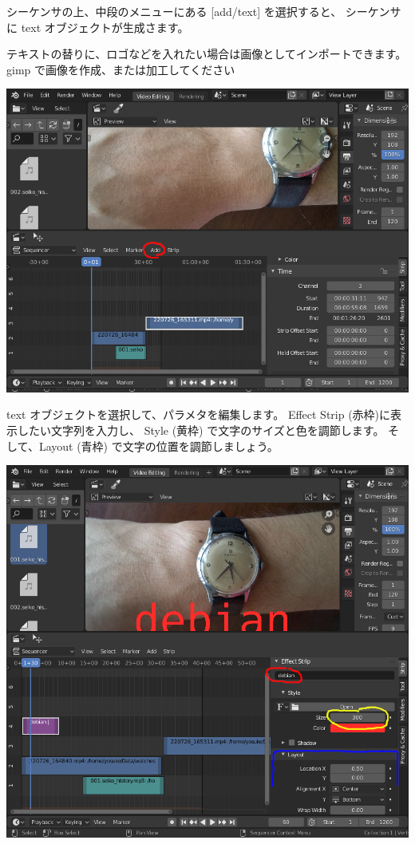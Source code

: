 \documentclass[mingoth,a4paper]{jsarticle}
\begin{document}
シーケンサの上、中段のメニューにある [add/text] を選択すると、
シーケンサに text オブジェクトが生成さます。

テキストの替りに、ロゴなどを入れたい場合は画像としてインポートできます。
gimp で画像を作成、または加工してください

\begin{center}
\includegraphics[scale=0.3]{image202209/blender_add_text.png}
\end{center}

text オブジェクトを選択して、パラメタを編集します。
Effect Strip (赤枠)に表示したい文字列を入力し、
Style (黄枠) で文字のサイズと色を調節します。
そして、Layout (青枠) で文字の位置を調節しましょう。

\begin{center}
\includegraphics[scale=0.3]{image202209/blender_text_params.png}
\end{center}
\end{document}
